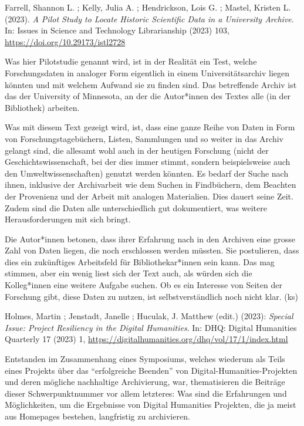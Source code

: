 \documentclass[a4paper,
fontsize=11pt,
oneside,
numbers=noperiodatend,
parskip=half-,
bibliography=totoc,
final
]{scrartcl}
\begin{document}
Farrell, Shannon L. ; Kelly, Julia A. ; Hendrickson, Lois G. ; Mastel,
Kristen L. (2023). \emph{A Pilot Study to Locate Historic Scientific
Data in a University Archive}. In: Issues in Science and Technology
Librarianship (2023) 103, \url{https://doi.org/10.29173/istl2728}

Was hier Pilotstudie genannt wird, ist in der Realität ein Test, welche
Forschungsdaten in analoger Form eigentlich in einem Universitätsarchiv
liegen könnten und mit welchem Aufwand sie zu finden sind. Das
betreffende Archiv ist das der University of Minnesota, an der die
Autor*innen des Textes alle (in der Bibliothek) arbeiten.

Was mit diesem Text gezeigt wird, ist, dass eine ganze Reihe von Daten
in Form von Forschungstagebüchern, Listen, Sammlungen und so weiter in
das Archiv gelangt sind, die allesamt wohl auch in der heutigen
Forschung (nicht der Geschichtswissenschaft, bei der dies immer stimmt,
sondern beispielsweise auch den Umweltwissenschaften) genutzt werden
könnten. Es bedarf der Suche nach ihnen, inklusive der Archivarbeit wie
dem Suchen in Findbüchern, dem Beachten der Provenienz und der Arbeit
mit analogen Materialien. Dies dauert seine Zeit. Zudem sind die Daten
alle unterschiedlich gut dokumentiert, was weitere Herausforderungen mit
sich bringt.

Die Autor*innen betonen, dass ihrer Erfahrung nach in den Archiven eine
grosse Zahl von Daten liegen, die noch erschlossen werden müssten. Sie
postulieren, dass dies ein zukünftiges Arbeitsfeld für
Bibliothekar*innen sein kann. Das mag stimmen, aber ein wenig liest sich
der Text auch, als würden sich die Kolleg*innen eine weitere Aufgabe
suchen. Ob es ein Interesse von Seiten der Forschung gibt, diese Daten
zu nutzen, ist selbstverständlich noch nicht klar. (ks)

Holmes, Martin ; Jenstadt, Janelle ; Huculak, J. Matthew (edit.) (2023):
\emph{Special Issue: Project Resiliency in the Digital Humanities}. In:
DHQ: Digital Humanities Quarterly 17 (2023) 1,
\url{https://digitalhumanities.org/dhq/vol/17/1/index.html}

Entstanden im Zusammenhang eines Symposiums, welches wiederum als Teils
eines Projekts über das \enquote{erfolgreiche Beenden} von
Digital-Humanities-Projekten und deren mögliche nachhaltige
Archivierung, war, thematisieren die Beiträge dieser Schwerpunktnummer
vor allem letzteres: Was sind die Erfahrungen und Möglichkeiten, um die
Ergebnisse von Digital Humanities Projekten, die ja meist aus Homepages
bestehen, langfristig zu archivieren.
\end{document}
